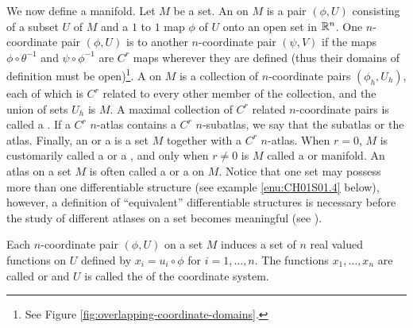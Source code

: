 \documentclass[../main]{subfiles}
\begin{document}
We now define a manifold. Let $M$ be a set. An  on $M$ is a pair $(\phi, U)$ consisting of a subset $U$ of $M$ and a $1$ to $1$ map $\phi$ of $U$ onto an open set in $\mathbb{R}^n$. One $n$-coordinate pair $(\phi, U)$ is  to another $n$-coordinate pair $(\psi, V)$ if the maps $\phi\circ\theta^{-1}$ and $\psi\circ\phi^{-1}$ are $C^r$ maps wherever they are defined (thus their domains of definition must be open)\footnote{See Figure \ref{fig:overlapping-coordinate-domains}.}. A  on $M$ is a collection of $n$-coordinate pairs $(\phi_h, U_h)$, each of which is $C^r$ related to every other member of the collection, and the union of sets $U_h$ is $M$. A maximal collection of $C^r$ related $n$-coordinate pairs is called a . If a $C^r$ $n$-atlas contains a $C^r$ $n$-subatlas, we say that the subatlas  or  the atlas. Finally, an  or a  is a set $M$ together with a $C^r$ $n$-atlas. When $r=0$, $M$ is customarily called a  or a , and only when $r \ne 0$ is $M$ called a  or  manifold. An atlas on a set $M$ is often called a  or a  on $M$. Notice that one set may possess more than one differentiable structure (see example \ref{enu:CH01S01.4} below), however, a definition of ``equivalent'' differentiable structures is necessary before the study of different atlases on a set becomes meaningful (see \cite{munkres1966elementary}).

Each $n$-coordinate pair $(\phi, U)$ on a set $M$ induces a set of $n$ real valued functions on $U$ defined by $x_i = u_i \circ \phi$ for $i = 1,\dots, n$. The functions $x_1,\dots,x_n$ are called  or  and $U$ is called the  of the coordinate system.
\end{document}
